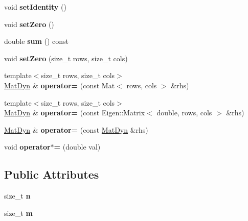 \begin{DoxyCompactItemize}
void {\bfseries set\+Identity} ()
\item 
\mbox{\label{classraisim_1_1MatDyn_aca80aafdc1f1e85c0c02c63b9a8f0e3e}} 
void {\bfseries set\+Zero} ()
\item 
\mbox{\label{classraisim_1_1MatDyn_adae64fe624b58ee6e20dafa639eb0618}} 
double {\bfseries sum} () const
\item 
\mbox{\label{classraisim_1_1MatDyn_a7da4bf4ccbc60e1465768f2a97c4fb06}} 
void {\bfseries set\+Zero} (size\+\_\+t rows, size\+\_\+t cols)
\item 
\mbox{\label{classraisim_1_1MatDyn_a398b8a0de5cd3446b9de4dc98d0487f0}} 
{\footnotesize template$<$size\+\_\+t rows, size\+\_\+t cols$>$ }\\\hyperlink{classraisim_1_1MatDyn}{Mat\+Dyn} \& {\bfseries operator=} (const Mat$<$ rows, cols $>$ \&rhs)
\item 
\mbox{\label{classraisim_1_1MatDyn_a1d7a0926398c8dad3421ae61de6b75fd}} 
{\footnotesize template$<$size\+\_\+t rows, size\+\_\+t cols$>$ }\\\hyperlink{classraisim_1_1MatDyn}{Mat\+Dyn} \& {\bfseries operator=} (const Eigen\+::\+Matrix$<$ double, rows, cols $>$ \&rhs)
\item 
\mbox{\label{classraisim_1_1MatDyn_a58622aa9fc3f0781e77902a30020318d}} 
\hyperlink{classraisim_1_1MatDyn}{Mat\+Dyn} \& {\bfseries operator=} (const \hyperlink{classraisim_1_1MatDyn}{Mat\+Dyn} \&rhs)
\item 
\mbox{\label{classraisim_1_1MatDyn_a715fb7a58a9555aef1e67ecb66a38c7f}} 
void {\bfseries operator$\ast$=} (double val)
\end{DoxyCompactItemize}
\subsection*{Public Attributes}
\begin{DoxyCompactItemize}
\item 
\mbox{\label{classraisim_1_1MatDyn_af23fc918062e64a984c541aec57cbbd3}} 
size\+\_\+t {\bfseries n}
\item 
\mbox{\label{classraisim_1_1MatDyn_a5b282eb0980041156b8dc957e84dfad3}} 
size\+\_\+t {\bfseries m}
\end{DoxyCompactItemize}


